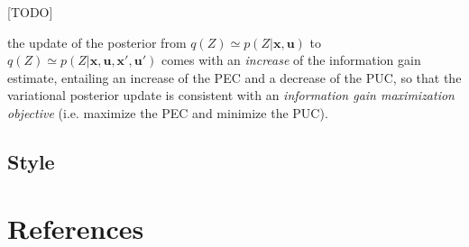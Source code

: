\documentclass{article}
\begin{document}
{{\color{blue} [TODO]}

the update of the posterior from  $q(Z) \simeq p(Z|\boldsymbol{x}, \boldsymbol{u})$ to $q(Z) \simeq p(Z|\boldsymbol{x}, \boldsymbol{u}, \boldsymbol{x}', \boldsymbol{u}')$ comes with an \emph{increase} of the information gain estimate, entailing an increase of the PEC and a decrease of the PUC, so that the variational posterior update is consistent with an \emph{information gain maximization objective} (i.e. maximize the PEC and minimize the PUC). 


}


\subsection{Style}


\section*{References}


\end{document}

